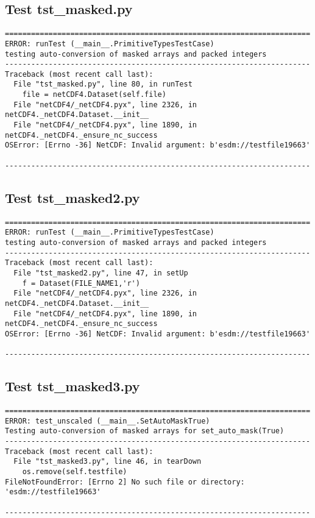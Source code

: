 \subsection{Test tst\_masked.py}

\begin{verbatim}
======================================================================
ERROR: runTest (__main__.PrimitiveTypesTestCase)
testing auto-conversion of masked arrays and packed integers
----------------------------------------------------------------------
Traceback (most recent call last):
  File "tst_masked.py", line 80, in runTest
    file = netCDF4.Dataset(self.file)
  File "netCDF4/_netCDF4.pyx", line 2326, in netCDF4._netCDF4.Dataset.__init__
  File "netCDF4/_netCDF4.pyx", line 1890, in netCDF4._netCDF4._ensure_nc_success
OSError: [Errno -36] NetCDF: Invalid argument: b'esdm://testfile19663'

----------------------------------------------------------------------
\end{verbatim}

\subsection{Test tst\_masked2.py}

\begin{verbatim}
======================================================================
ERROR: runTest (__main__.PrimitiveTypesTestCase)
testing auto-conversion of masked arrays and packed integers
----------------------------------------------------------------------
Traceback (most recent call last):
  File "tst_masked2.py", line 47, in setUp
    f = Dataset(FILE_NAME1,'r')
  File "netCDF4/_netCDF4.pyx", line 2326, in netCDF4._netCDF4.Dataset.__init__
  File "netCDF4/_netCDF4.pyx", line 1890, in netCDF4._netCDF4._ensure_nc_success
OSError: [Errno -36] NetCDF: Invalid argument: b'esdm://testfile19663'

----------------------------------------------------------------------
\end{verbatim}

\subsection{Test tst\_masked3.py}

\begin{verbatim}
======================================================================
ERROR: test_unscaled (__main__.SetAutoMaskTrue)
Testing auto-conversion of masked arrays for set_auto_mask(True)
----------------------------------------------------------------------
Traceback (most recent call last):
  File "tst_masked3.py", line 46, in tearDown
    os.remove(self.testfile)
FileNotFoundError: [Errno 2] No such file or directory: 'esdm://testfile19663'

----------------------------------------------------------------------
\end{verbatim}

